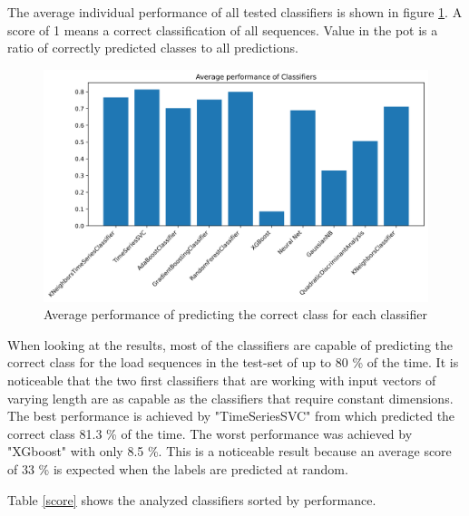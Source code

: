 The average individual performance of all tested classifiers is shown in figure \ref{fig:avgperf}. 
A score of 1 means a correct classification of all sequences. Value in the pot is a ratio of correctly predicted classes to all predictions.

\begin{figure}[H]
	\centering
	\includegraphics[width=1\linewidth]{IMGs/Average_performance_CLASS.png}
	\caption{Average performance of predicting the correct class for each classifier}
	\label{fig:avgperf}
\end{figure}

When looking at the results, most of the classifiers are capable of predicting the correct class for the load sequences in the test-set of up to 80 \% of the time. 
It is noticeable that the two first classifiers that are working with input vectors of varying length are as capable as the classifiers that require constant dimensions. The best performance is achieved by "TimeSeriesSVC" from \cite{tslearn} which predicted the correct class 81.3 \% of the time. The worst performance was achieved by "XGboost" with only 8.5 \%. This is a noticeable result because an average score of 33 \% is expected when the labels are predicted at random. 

Table \ref{score} shows the analyzed classifiers sorted by performance. 


